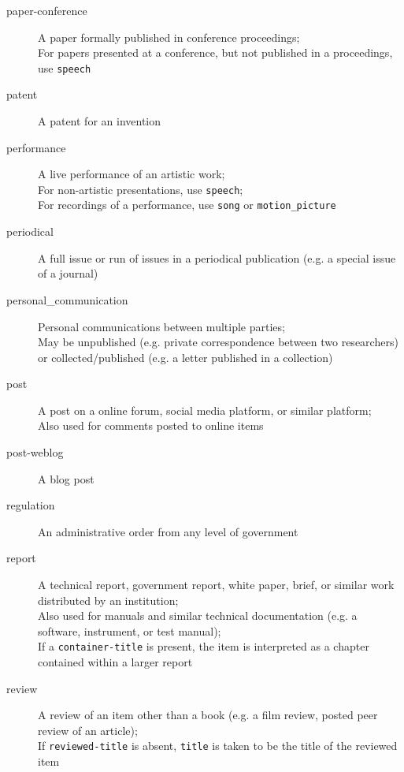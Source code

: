 \begin{description}
  \item[paper-conference]
    A paper formally published in conference proceedings;\\
    For papers presented at a conference, but not published in a
    proceedings, use \texttt{speech}

  \item[patent]
    A patent for an invention

  \item[performance]
    A live performance of an artistic work;\\
    For non-artistic presentations, use \texttt{speech};\\
    For recordings of a performance, use \texttt{song} or
    \texttt{motion\_picture}

  \item[periodical]
    A full issue or run of issues in a periodical publication (e.g. a
    special issue of a journal)

  \item[personal\_communication]
    Personal communications between multiple parties;\\
    May be unpublished (e.g. private correspondence between two researchers)
    or collected/published (e.g. a letter published in a collection)

  \item[post]
    A post on a online forum, social media platform, or similar platform;\\
    Also used for comments posted to online items

  \item[post-weblog]
    A blog post

  \item[regulation]
    An administrative order from any level of government

  \item[report]
    A technical report, government report, white paper, brief, or similar
    work distributed by an institution;\\
    Also used for manuals and similar technical documentation (e.g. a
    software, instrument, or test manual);\\
    If a \texttt{container-title} is present, the item is interpreted as a
    chapter contained within a larger report

  \item[review]
    A review of an item other than a book (e.g. a film review, posted peer
    review of an article);\\
    If \texttt{reviewed-title} is absent, \texttt{title} is taken to be the
    title of the reviewed item


\end{description}
